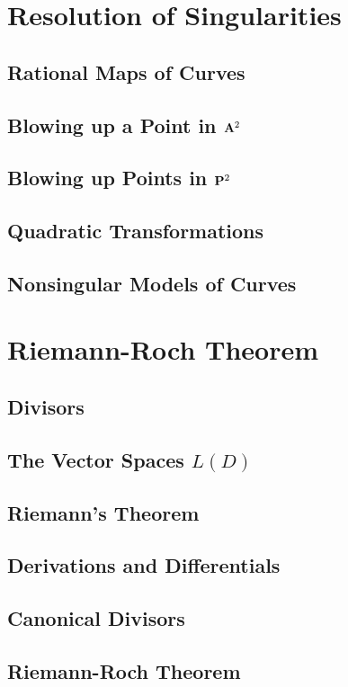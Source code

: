 \documentclass[oneside]{amsbook}
\numberwithin{prob}{chapter}
\begin{document}
\chapter{Resolution of Singularities}
\section{Rational Maps of Curves}

\section{Blowing up a Point in $\AA^2$}

\section{Blowing up Points in $\PP^2$}

\section{Quadratic Transformations}

\section{Nonsingular Models of Curves}


\chapter{Riemann-Roch Theorem}
\section{Divisors}

\section{The Vector Spaces $L(D)$}

\section{Riemann's Theorem}

\section{Derivations and Differentials}

\section{Canonical Divisors}

\section{Riemann-Roch Theorem}

\end{document}
